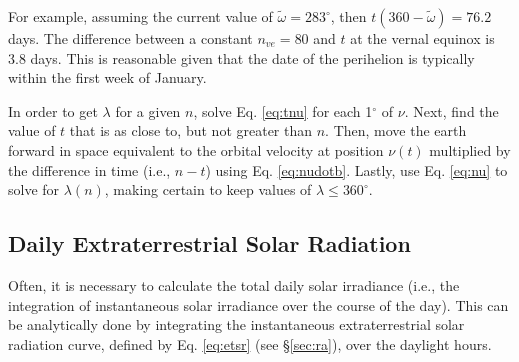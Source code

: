 For example, assuming the current value of $\tilde{\omega} = 283^{\circ}$, then $t(360 - \tilde{\omega}) = 76.2$ days. 
The difference between a constant $n_{ve} = 80$ and $t$ at the vernal equinox is 3.8 days. 
This is reasonable given that the date of the perihelion is typically within the first week of January. 

In order to get $\lambda$ for a given $n$, solve Eq. \ref{eq:tnu} for each 1$^{\circ}$ of $\nu$. 
Next, find the value of $t$ that is as close to, but not greater than $n$.   
Then, move the earth forward in space equivalent to the orbital velocity at position $\nu(t)$ multiplied by the difference in time (i.e., $n-t$) using Eq. \ref{eq:nudotb}. 
Lastly, use Eq. \ref{eq:nu} to solve for $\lambda(n)$, making certain to keep values of $\lambda \leq 360^{\circ}$.

\subsection{Daily Extraterrestrial Solar Radiation}
\label{sec:dra}
Often, it is necessary to calculate the total daily solar irradiance (i.e., the integration of instantaneous solar irradiance over the course of the day). 
This can be analytically done by integrating the instantaneous extraterrestrial solar radiation curve, defined by Eq. \ref{eq:etsr} (see \S \ref{sec:ra}), over the daylight hours. 

